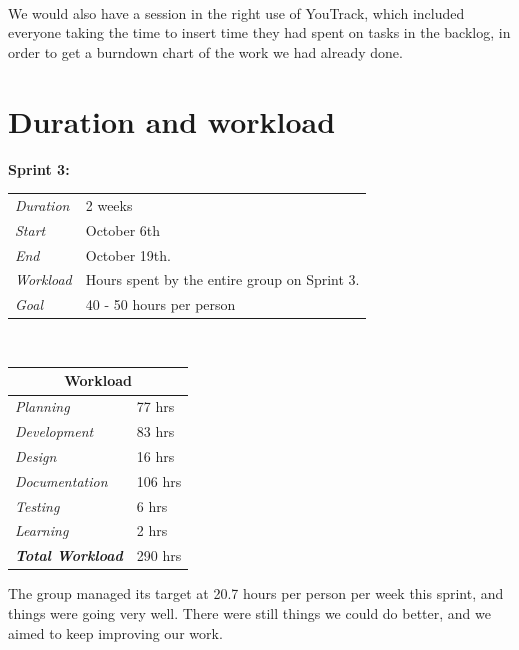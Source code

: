 \paragraph{} We would also have a session in the right use of YouTrack, which included everyone taking the time to insert time they had spent on tasks in the backlog, in order to get a burndown chart of the work we had already done.

\section{Duration and workload}
\label{sec:S4Duration}

\begin{minipage}{\linewidth}
\centering
\setlength{\tabcolsep}{22pt}
\textbf{Sprint 3:} 
\smallskip
{}
\begin{tabular}{ |l l| }
	\hline
	\it{Duration} & 2 weeks \\
	\it{Start} & October 6th \\
	\it{End} & October 19th. \\
	\it{Workload} & Hours spent by the entire group on Sprint 3. \\
	\it{Goal} & 40 - 50 hours per person \\
	\hline
\end{tabular}
\end{minipage}\\%
%
\begin{minipage}{\linewidth}
\setlength{\tabcolsep}{15pt}
\centering
{}
\begin{tabular}{ |l|l| }
	\hline
	\multicolumn{2}{|c|}{\cellcolor{gray!25} Workload} \\
	\hline
	\it{Planning} & 77 hrs\\
	\it{Development} & 83 hrs\\
	\it{Design} & 16 hrs\\
	\it{Documentation} & 106 hrs\\
	\it{Testing} & 6 hrs\\
	\it{Learning} & 2 hrs\\
	\hline
	\textbf{\textit{Total Workload}} & 290 hrs\\
	\hline
\end{tabular}
\end{minipage}

The group managed its target at 20.7 hours per person per week this sprint, and things were going very well. There were still things we could do better, and we aimed to keep improving our work.

